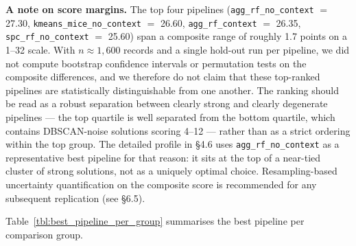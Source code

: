 \textbf{A note on score margins.} The top four pipelines (\texttt{agg\_rf\_no\_context} $=$ 27.30, \texttt{kmeans\_mice\_no\_context} $=$ 26.60, \texttt{agg\_rf\_context} $=$ 26.35, \texttt{spc\_rf\_no\_context} $=$ 25.60) span a composite range of roughly 1.7 points on a 1--32 scale. With $n \approx 1{,}600$ records and a single hold-out run per pipeline, we did not compute bootstrap confidence intervals or permutation tests on the composite differences, and we therefore do not claim that these top-ranked pipelines are statistically distinguishable from one another. The ranking should be read as a robust separation between clearly strong and clearly degenerate pipelines --- the top quartile is well separated from the bottom quartile, which contains DBSCAN-noise solutions scoring 4--12 --- rather than as a strict ordering within the top group. The detailed profile in \S4.6 uses \texttt{agg\_rf\_no\_context} as a representative best pipeline for that reason: it sits at the top of a near-tied cluster of strong solutions, not as a uniquely optimal choice. Resampling-based uncertainty quantification on the composite score is recommended for any subsequent replication (see \S6.5).

Table~\ref{tbl:best_pipeline_per_group} summarises the best pipeline per comparison group.

